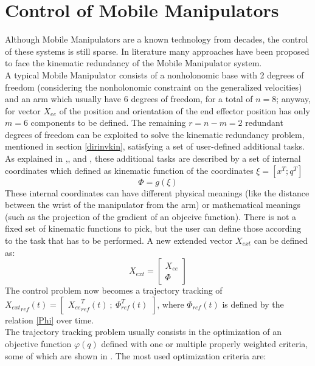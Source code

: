 \section{Control of Mobile Manipulators}
Although Mobile Manipulators are a known technology from decades, the control of these systems is still sparse. In literature many approaches have been proposed to face the kinematic redundancy of the Mobile Manipulator system. \\
A typical Mobile Manipulator consists of a nonholonomic base with 2 degrees of freedom (considering the nonholonomic constraint on the generalized velocities) and an arm which usually have 6 degrees of freedom, for a total of $n=8$; anyway, for vector $X_{ee}$ of the position and orientation of the end effector position has only $m=6$ components to be defined. The remaining $r=n-m=2$ redundant degrees of freedom can be exploited to solve the kinematic redundancy problem, mentioned in section \ref{dirinvkin}, satisfying a set of user-defined additional tasks. As explained in \cite{bayle},\cite{seraji1998},\cite{seraji1993} and \cite{mikschschroeder}, these additional tasks are described by a set of internal coordinates which defined as kinematic function of the coordinates $\xi=\left[x^T ; q^T\right]$
\begin{equation}\label{Phi}
	\Phi=g(\xi)
\end{equation}
These internal coordinates can have different physical meanings (like the distance between the wrist of the manipulator from the arm) or mathematical meanings (such as the projection of the gradient of an objecive function). There is not a fixed set of kinematic functions to pick, but the user can define those according to the task that has to be performed. A new extended vector $X_{ext}$ can be defined as:
\begin{equation}
	X_{ext}=\left[\begin{matrix}
	X_{ee} \\ \Phi
	\end{matrix}\right]
\end{equation}
The control problem now becomes a trajectory tracking of ${X_{ext}}_{ref}(t) =\left[\begin{matrix} {X_{ee}}_{ref}^T(t) \ ;\ \Phi_{ref}^T(t) \end{matrix}\right]$, where $ \Phi_{ref}(t)$ is defined by the relation \ref{Phi} over time.\\
The trajectory tracking problem usually consists in the optimization of an objective function $\varphi(q)$ defined with one or multiple properly weighted criteria, some of which are shown in \cite{multicriteria}. The most used optimization criteria are: 
